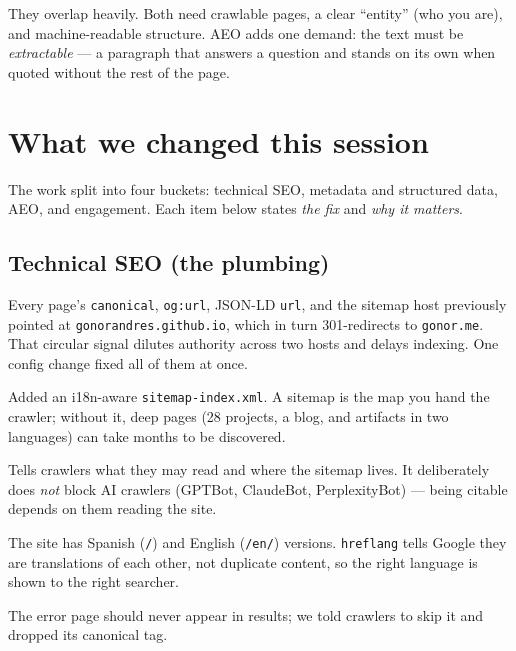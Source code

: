 \documentclass[11pt]{article}
\begin{document}
They overlap heavily. Both need crawlable pages, a clear ``entity'' (who you
are), and machine-readable structure. AEO adds one demand: the text must be
\emph{extractable} --- a paragraph that answers a question and stands on its
own when quoted without the rest of the page.

\section{What we changed this session}

The work split into four buckets: technical SEO, metadata and structured data,
AEO, and engagement. Each item below states \emph{the fix} and \emph{why it
matters}.

\subsection{Technical SEO (the plumbing)}

\begin{description}[leftmargin=0em, style=nextline]
  \item[Canonical domain unified to \texttt{gonor.me}.]
  Every page's \texttt{canonical}, \texttt{og:url}, JSON-LD \texttt{url}, and
  the sitemap host previously pointed at \texttt{gonorandres.github.io}, which
  in turn 301-redirects to \texttt{gonor.me}. That circular signal dilutes
  authority across two hosts and delays indexing. One config change fixed all
  of them at once.
  \item[Sitemap generated.] Added an i18n-aware \texttt{sitemap-index.xml}. A
  sitemap is the map you hand the crawler; without it, deep pages (28 projects,
  a blog, and artifacts in two languages) can take months to be discovered.
  \item[\texttt{robots.txt} created.] Tells crawlers what they may read and
  where the sitemap lives. It deliberately does \emph{not} block AI crawlers
  (GPTBot, ClaudeBot, PerplexityBot) --- being citable depends on them reading
  the site.
  \item[\texttt{hreflang} added.] The site has Spanish (\texttt{/}) and English
  (\texttt{/en/}) versions. \texttt{hreflang} tells Google they are
  translations of each other, not duplicate content, so the right language is
  shown to the right searcher.
  \item[404 marked \texttt{noindex}.] The error page should never appear in
  results; we told crawlers to skip it and dropped its canonical tag.
\end{description}
\end{document}

